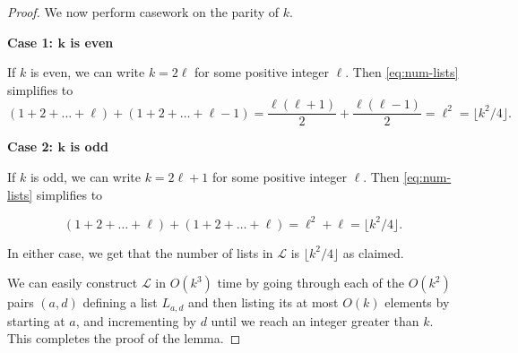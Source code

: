 \documentclass[11pt]{article}
\theoremstyle{definition}
\begin{document}
\begin{proof}
    We now perform casework on the parity of $k$.

    \textbf{Case 1: $\boldsymbol{k}$ is even}

        If $k$ is even, we can write $k=2\ell$ for some positive integer $\ell$.
        Then \cref{eq:num-lists} simplifies to
            \[(1 + 2 + \dots + \ell) + (1 + 2 + \dots + \ell-1) = \frac{\ell(\ell+1)}{2} + \frac{\ell(\ell-1)}{2} = \ell^2 = \lfloor k^2/4\rfloor.\]

        \textbf{Case 2: $\boldsymbol{k}$ is odd}

    If $k$ is odd, we can write $k=2\ell+1$ for some positive integer $\ell$.
    Then \cref{eq:num-lists} simplifies to

        \[(1 + 2 + \dots + \ell) + (1 + 2 + \dots + \ell) = \ell^2 + \ell = \lfloor k^2/4\rfloor.\]

    In either case, we get that the number of lists in $\mathcal{L}$ is $\lfloor k^2/4\rfloor$ as claimed.

    We can easily construct $\mathcal{L}$ in $O(k^3)$ time by going through each of the $O(k^2)$ pairs $(a,d)$ defining a list $L_{a,d}$ and then listing its at most $O(k)$ elements by starting at $a$, and incrementing by $d$ until we reach an integer greater than $k$.
    This completes the proof of the lemma. 
\end{proof}





\end{document}
